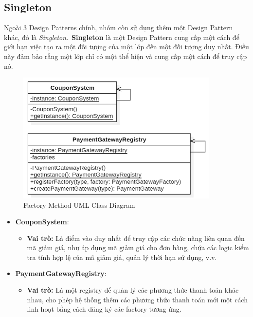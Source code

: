 \subsection{Singleton}
\begin{flushleft}
    Ngoài 3 Design Patterns chính, nhóm còn sử dụng thêm một Design Pattern khác, đó là \textit{Singleton}.~\textbf{Singleton} là một Design Pattern cung cấp một cách để giới hạn việc tạo ra một đối tượng của một lớp đến một đối tượng duy nhất. Điều này đảm bảo rằng một lớp chỉ có một thể hiện và cung cấp một cách để truy cập nó.

    \begin{figure}[H]
        \centering
        \includegraphics[width=0.9\textwidth]{../assets/screenshots/uml/singleton.png}
        \caption{Factory Method UML Class Diagram}
    \end{figure}

    \begin{itemize}
        \item \textbf{CouponSystem}:
              \begin{itemize}
                  \item \textbf{Vai trò:} Là điểm vào duy nhất để truy cập các chức năng liên quan đến mã giảm giá, như áp dụng mã giảm giá cho đơn hàng, chứa các logic kiểm tra tính hợp lệ của mã giảm giá, quản lý thời hạn sử dụng, v.v.
              \end{itemize}
        \item \textbf{PaymentGatewayRegistry}:
              \begin{itemize}
                  \item \textbf{Vai trò:} Là một registry để quản lý các phương thức thanh toán khác nhau, cho phép hệ thống thêm các phương thức thanh toán mới một cách linh hoạt bằng cách đăng ký các factory tương ứng.
              \end{itemize}
    \end{itemize}
\end{flushleft}
